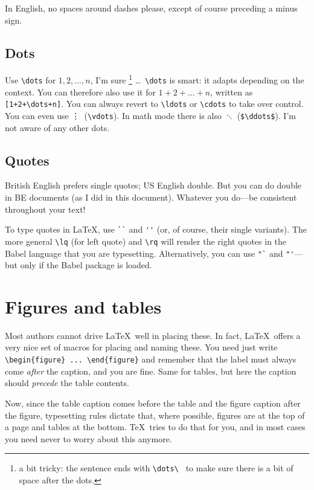 \documentclass{article}
\begin{document}
In English, no spaces around dashes please, except of course preceding a minus sign.

\subsection{Dots}
Use \verb+\dots+ for $1,2,\dots,n$, I'm sure%
\footnote{a bit tricky: the sentence ends with \protect\verb+\dots\ + to make sure
there is a bit of space after the dots.}%
\dots\ \verb+\dots+ is smart: it adapts depending on the context.  You can therefore also use it for $1+2+\dots+n$, written as \verb-[1+2+\dots+n]-. You can always revert to \verb+\ldots+ or \verb+\cdots+ to take over control.  You can even use \vdots\ (\verb+\vdots+).  In math mode there is also $\ddots$ (\verb+$\ddots$+).  I'm not aware of any other dots.

\subsection{Quotes}
British English prefers single quotes; US English double.  But you can do double in BE documents (as I did in this document).  Whatever you do---be consistent throughout your text!

To type quotes in \LaTeX, use \verb+``+ and \verb+''+ (or, of course, their single variants).  The more general \verb+\lq+ (for left quote) and \verb+\rq+ will render the right quotes in the Babel language that you are typesetting.  Alternatively, you can use \verb+"`+ and \verb+"'+---but only if the Babel package is loaded.




\section{Figures and tables}
Most authors cannot drive \LaTeX\ well in placing these.  In fact, \LaTeX\ offers a very nice set of macros for placing and naming these.  You need just write \verb+\begin{figure} ... \end{figure}+ and remember that the label must always come \textsl{after} the caption, and you are fine.  Same for tables, but here the caption should \textsl{precede} the table contents.

Now, since the table caption comes before the table and the figure caption after the figure, typesetting rules dictate that, where possible, figures are at the top of a page and tables at the bottom.  \TeX\ tries to do that for you, and in most cases you need never to worry about this anymore.
\end{document}
